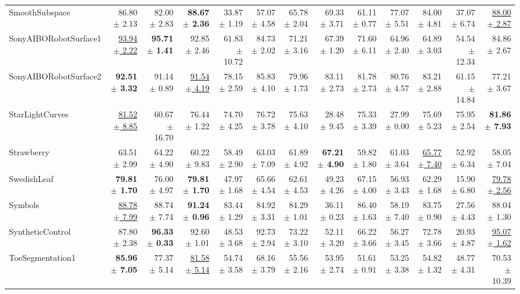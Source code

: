 \begin{landscape}
\begin{longtable}{lrrrrrrrrrrrr}
SmoothSubspace & 86.80 $\pm$ 2.13 & 82.00 $\pm$ 2.83 & \textbf{88.67 $\pm$ 2.36} & 33.87 $\pm$ 1.19 & 57.07 $\pm$ 4.58 & 65.78 $\pm$ 2.04 & 69.33 $\pm$ 3.71 & 61.11 $\pm$ 0.77 & 77.07 $\pm$ 5.51 & 84.00 $\pm$ 4.81 & 37.07 $\pm$ 6.74 & \underline{88.00 $\pm$ 2.87} \\
SonyAIBORobotSurface1 & \underline{93.94 $\pm$ 2.22} & \textbf{95.71 $\pm$ 1.41} & 92.85 $\pm$ 2.46 & 61.83 $\pm$ 10.72 & 84.73 $\pm$ 2.02 & 71.21 $\pm$ 3.16 & 67.39 $\pm$ 1.20 & 71.60 $\pm$ 6.11 & 64.96 $\pm$ 2.40 & 64.89 $\pm$ 3.03 & 54.54 $\pm$ 12.34 & 84.86 $\pm$ 2.67 \\
SonyAIBORobotSurface2 & \textbf{92.51 $\pm$ 3.32} & 91.14 $\pm$ 0.89 & \underline{91.54 $\pm$ 4.19} & 78.15 $\pm$ 2.59 & 85.83 $\pm$ 4.10 & 79.96 $\pm$ 1.73 & 83.11 $\pm$ 2.73 & 81.78 $\pm$ 2.73 & 80.76 $\pm$ 4.57 & 83.21 $\pm$ 2.88 & 61.15 $\pm$ 14.84 & 77.21 $\pm$ 3.67 \\
StarLightCurves & \underline{81.52 $\pm$ 8.85} & 60.67 $\pm$ 16.70 & 76.44 $\pm$ 1.22 & 74.70 $\pm$ 4.25 & 76.72 $\pm$ 3.78 & 75.63 $\pm$ 4.10 & 28.48 $\pm$ 9.45 & 75.33 $\pm$ 3.39 & 27.99 $\pm$ 0.00 & 75.69 $\pm$ 5.23 & 75.95 $\pm$ 2.54 & \textbf{81.86 $\pm$ 7.93} \\
Strawberry & 63.51 $\pm$ 2.99 & 64.22 $\pm$ 4.90 & 60.22 $\pm$ 9.83 & 58.49 $\pm$ 2.90 & 63.03 $\pm$ 7.09 & 61.89 $\pm$ 4.92 & \textbf{67.21 $\pm$ 4.90} & 59.82 $\pm$ 1.80 & 61.03 $\pm$ 3.64 & \underline{65.77 $\pm$ 7.40} & 52.92 $\pm$ 6.34 & 58.05 $\pm$ 7.04 \\
SwedishLeaf & \textbf{79.81 $\pm$ 1.70} & 76.00 $\pm$ 4.97 & \textbf{79.81 $\pm$ 1.70} & 47.97 $\pm$ 1.68 & 65.66 $\pm$ 4.54 & 62.61 $\pm$ 4.53 & 49.23 $\pm$ 4.26 & 67.15 $\pm$ 4.00 & 56.93 $\pm$ 3.43 & 62.29 $\pm$ 1.68 & 15.90 $\pm$ 6.80 & \underline{79.78 $\pm$ 2.56} \\
Symbols & \underline{88.78 $\pm$ 7.99} & 88.74 $\pm$ 7.74 & \textbf{91.24 $\pm$ 0.96} & 83.44 $\pm$ 1.29 & 84.92 $\pm$ 3.31 & 84.29 $\pm$ 1.01 & 36.11 $\pm$ 0.23 & 86.40 $\pm$ 1.63 & 58.19 $\pm$ 7.40 & 83.75 $\pm$ 0.90 & 27.56 $\pm$ 4.43 & 88.04 $\pm$ 1.30 \\
SyntheticControl & 87.80 $\pm$ 2.38 & \textbf{96.33 $\pm$ 0.33} & 92.60 $\pm$ 1.01 & 48.53 $\pm$ 3.68 & 92.73 $\pm$ 2.94 & 73.22 $\pm$ 3.10 & 52.11 $\pm$ 3.20 & 66.22 $\pm$ 3.66 & 56.27 $\pm$ 3.45 & 72.78 $\pm$ 3.66 & 20.93 $\pm$ 4.87 & \underline{95.07 $\pm$ 1.62} \\
ToeSegmentation1 & \textbf{85.96 $\pm$ 7.05} & 77.37 $\pm$ 5.14 & \underline{81.58 $\pm$ 5.14} & 54.74 $\pm$ 3.58 & 68.16 $\pm$ 3.79 & 55.56 $\pm$ 2.16 & 53.95 $\pm$ 2.74 & 51.61 $\pm$ 0.91 & 53.25 $\pm$ 3.38 & 54.82 $\pm$ 1.32 & 48.77 $\pm$ 4.31 & 70.53 $\pm$ 10.39 \\

\end{longtable}
\end{landscape}
